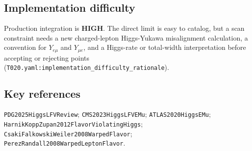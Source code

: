 \subsection*{Implementation difficulty}
Production integration is \textbf{HIGH}.  The direct limit is easy to catalog,
but a scan constraint needs a new charged-lepton Higgs-Yukawa misalignment
calculation, a convention for \(Y_{e\mu}\) and \(Y_{\mu e}\), and a Higgs-rate
or total-width interpretation before accepting or rejecting points
(\texttt{T020.yaml:implementation\_difficulty\_rationale}).

\subsection*{Key references}
\texttt{PDG2025HiggsLFVReview}; \texttt{CMS2023HiggsLFVEMu};
\texttt{ATLAS2020HiggsEMu}; \texttt{HarnikKoppZupan2012FlavorViolatingHiggs};
\texttt{CsakiFalkowskiWeiler2008WarpedFlavor};
\texttt{PerezRandall2008WarpedLeptonFlavor}.
